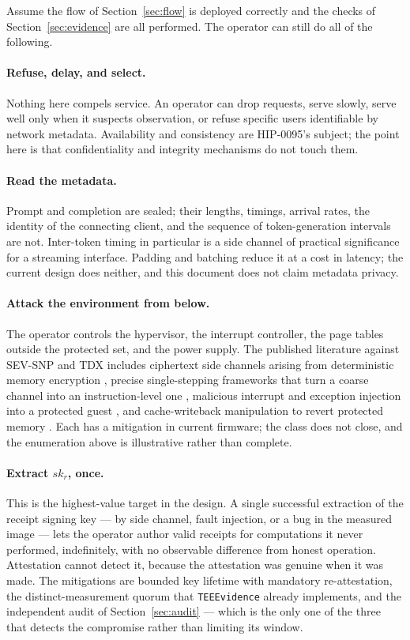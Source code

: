 \documentclass[11pt]{article}
\newcommand{\code}[1]{\texttt{#1}}
\begin{document}
Assume the flow of Section~\ref{sec:flow} is deployed correctly and the checks of
Section~\ref{sec:evidence} are all performed. The operator can still do all of the following.

\paragraph{Refuse, delay, and select.}
Nothing here compels service. An operator can drop requests, serve slowly, serve well only when it
suspects observation, or refuse specific users identifiable by network metadata. Availability and
consistency are HIP-0095's subject; the point here is that confidentiality and integrity mechanisms
do not touch them.

\paragraph{Read the metadata.}
Prompt and completion are sealed; their lengths, timings, arrival rates, the identity of the
connecting client, and the sequence of token-generation intervals are not. Inter-token timing in
particular is a side channel of practical significance for a streaming interface. Padding and
batching reduce it at a cost in latency; the current design does neither, and this document does not
claim metadata privacy.

\paragraph{Attack the environment from below.}
The operator controls the hypervisor, the interrupt controller, the page tables outside the
protected set, and the power supply. The published literature against SEV-SNP and TDX includes
ciphertext side channels arising from deterministic memory encryption \cite{cipherleaks}, precise
single-stepping frameworks that turn a coarse channel into an instruction-level one
\cite{sevstep}, malicious interrupt and exception injection into a protected guest
\cite{heckler,wesee}, and cache-writeback manipulation to revert protected memory \cite{cachewarp}.
Each has a mitigation in current firmware; the class does not close, and the enumeration above is
illustrative rather than complete.

\paragraph{Extract $sk_r$, once.}
This is the highest-value target in the design. A single successful
extraction of the receipt signing key --- by side channel, fault injection, or a bug in the measured
image --- lets the operator author valid receipts for computations it never performed, indefinitely,
with no observable difference from honest operation. Attestation cannot detect it, because the
attestation was genuine when it was made. The mitigations are bounded key lifetime with mandatory
re-attestation, the distinct-measurement quorum that \code{TEEEvidence} already
implements, and the independent audit of Section~\ref{sec:audit} --- which is the only one of the
three that detects the compromise rather than limiting its window.
\end{document}
